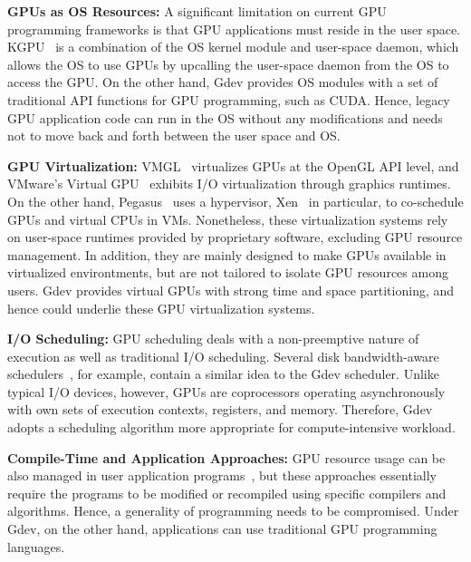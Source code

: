 \begin{comment}
Comparisons of Gdev and representatives of the above GPU resource
management approaches are summarized in Table~\ref{tab:related_work}.
\begin{table*}[t]
 \caption{Comparisons of Gdev and prior GPU resource management
 approaches.}
 \label{tab:related_work}
 \begin{center}
  {\sf
  \begin{tabular}{|l|p{12.8cm}|}
   \hline
   \hline
  \end{tabular}
  }
 \end{center}
\vspace{-1em}
\end{table*}
\end{comment}


\textbf{GPUs as OS Resources:}
A significant limitation on current GPU programming frameworks is
that GPU applications must reside in the user space.
KGPU~\cite{Sun_SECURITY11_Poster} is a combination of the OS kernel
module and user-space daemon, which allows the OS to use GPUs by
upcalling the user-space daemon from the OS to access the GPU.
On the other hand, Gdev provides OS modules with a set of traditional
API functions for GPU programming, such as CUDA.
Hence, legacy GPU application code can run in the OS without any
modifications and needs not to move back and forth between the user
space and OS.

\textbf{GPU Virtualization:}
VMGL~\cite{Lagar-Cavilla_VEE07} virtualizes GPUs at the OpenGL
API level, and VMware's Virtual GPU~\cite{Dowty_SIGOPS09} exhibits I/O
virtualization through graphics runtimes.
On the other hand, Pegasus~\cite{Gupta_ATC11} uses a hypervisor,
Xen~\cite{Barham_SOSP03} in particular, to co-schedule GPUs and virtual
CPUs in VMs.
Nonetheless, these virtualization systems rely on user-space runtimes
provided by proprietary software, excluding GPU resource management.
In addition, they are mainly designed to make GPUs available in
virtualized environtments, but are not tailored to isolate GPU resources
among users.
Gdev provides virtual GPUs with strong time and space partitioning, and
hence could underlie these GPU virtualization systems.

\textbf{I/O Scheduling:}
GPU scheduling deals with a non-preemptive nature of execution as well
as traditional I/O scheduling.
Several disk bandwidth-aware schedulers~\cite{Gulati_FAST09,
Povzner_EUROSYS08, Wang_FAST07}, for example, contain a similar idea to
the Gdev scheduler.
Unlike typical I/O devices, however, GPUs are coprocessors operating
asynchronously with own sets of execution contexts, registers, and memory.
Therefore, Gdev adopts a scheduling algorithm more appropriate for
compute-intensive workload.

\textbf{Compile-Time and Application Approaches:}
GPU resource usage can be also managed in user application
programs~\cite{Chen_IPDPS10,Guevara09,Saba_RTSS11}, but these approaches
essentially require the programs to be modified or recompiled using
specific compilers and algorithms.
Hence, a generality of programming needs to be compromised.
Under Gdev, on the other hand, applications can use traditional GPU
programming languages.


